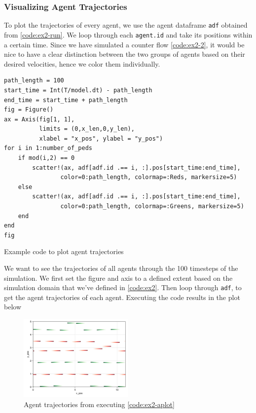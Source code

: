 \subsubsection*{Visualizing Agent Trajectories}
To plot the trajectories of every agent, we use the agent dataframe \texttt{adf} obtained from \autoref{code:ex2-run}. We loop through each \texttt{agent.id} and take its positions within a certain time. Since we have simulated a counter flow \autoref{code:ex2-2}, it would be nice to have a clear distinction between the two groups of agents based on their desired velocities, hence we color them individually.
\begin{listing}[H]
\begin{verbatim}
path_length = 100
start_time = Int(T/model.dt) - path_length
end_time = start_time + path_length
fig = Figure()
ax = Axis(fig[1, 1], 
          limits = (0,x_len,0,y_len), 
          xlabel = "x_pos", ylabel = "y_pos")
for i in 1:number_of_peds
    if mod(i,2) == 0
        scatter!(ax, adf[adf.id .== i, :].pos[start_time:end_time], 
                color=0:path_length, colormap=:Reds, markersize=5)
    else
        scatter!(ax, adf[adf.id .== i, :].pos[start_time:end_time], 
                color=0:path_length, colormap=:Greens, markersize=5)
    end
end
fig
\end{verbatim}
\caption{Example code to plot agent trajectories}
\label{code:ex2-aplot}
\end{listing}
We want to see the trajectories of all agents through the 100 timesteps of the simulation. We first set the figure and axis to a defined extent based on the simulation domain that we've defined in \autoref{code:ex2}. Then loop through \texttt{adf}, to get the agent trajectories of each agent. Executing the code results in the plot below

\begin{figure}[H]
    \centering
    \includegraphics[width=0.5\textwidth]{figures/ch6_tutorial/example_traj.png}
    \caption{Agent trajectories from executing \autoref{code:ex2-aplot}}
    \label{plot:ex2-aplot}
\end{figure}



